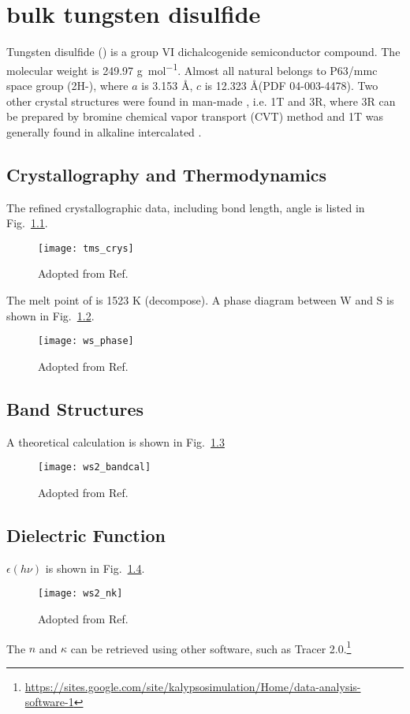 \chapter{bulk tungsten disulfide}



Tungsten disulfide () is a group VI dichalcogenide semiconductor compound. The molecular weight is 249.97 \si{g\per \mole}. Almost all natural  belongs to P63/mmc space group (2H-), where $a$ is 3.153 \AA, $c$ is 12.323 \AA (PDF 04-003-4478). Two other crystal structures were found in man-made , i.e. 1T and 3R, where 3R can be prepared by bromine chemical vapor transport (CVT) method \cite{Schutte1987} and 1T was generally found in alkaline intercalated .\cite{Yang1996a, Enyashin2011}


\section{Crystallography and Thermodynamics}

The refined crystallographic data, including bond length, angle is listed in Fig.~\ref{app:bond}. 

\begin{figure}[htb]
\centering
\texttt{[image: tms\_crys]}
\caption{Adopted from Ref.\cite{Schutte1987}}
\label{app:bond}
\end{figure}

The melt point of  is 1523 K (decompose). A phase diagram between W and S is shown in Fig.~\ref{app:pd}. 

\begin{figure}[htb]
\centering
\texttt{[image: ws\_phase]}
\caption{Adopted from Ref.\cite{Tenne1995,Tenne1998}}
\label{app:pd}
\end{figure}

\section{Band Structures}

A theoretical calculation is shown in Fig.~\ref{app:band} 
\begin{figure}[htb]
\centering
\texttt{[image: ws2\_bandcal]}
\caption{Adopted from Ref.\cite{Kuc2011}}
\label{app:band}
\end{figure}



\section{Dielectric Function}


$\epsilon(h\nu)$ is shown in Fig.~\ref{app:nk}. 
\begin{figure}[htb]
\centering
\texttt{[image: ws2\_nk]}
\caption{Adopted from Ref.\cite{Hughes1976}}
\label{app:nk}
\end{figure}

The $n$ and $\kappa$ can be retrieved using other software, such as Tracer 2.0.\footnote{\url{https://sites.google.com/site/kalypsosimulation/Home/data-analysis-software-1}}




